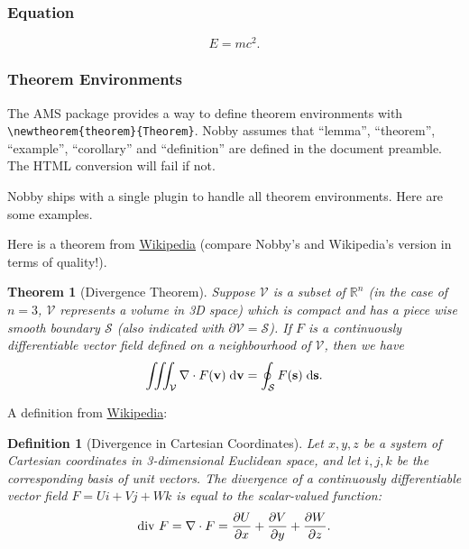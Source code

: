 \documentclass[10pt]{article}
\newtheorem{theorem}{Theorem}
\newtheorem{definition}{Definition}
\newcommand{\mvec}[1]{\mathbf{#1}}
\begin{document}
\subsubsection{Equation}
\begin{equation}
  \label{eq:rel}
  E = mc^2.
\end{equation}

\subsubsection{Theorem Environments}
The AMS package provides a way to define theorem environments with
\texttt{\textbackslash{newtheorem\{theorem\}\{Theorem\}}}. Nobby
assumes that ``lemma'', ``theorem'', ``example'', ``corollary'' and
``definition'' are defined in the document preamble. The HTML conversion
will fail if not.

Nobby ships with a single plugin to handle all theorem
environments. Here are some examples.

Here is a theorem from
\href{http://en.wikipedia.org/wiki/Divergence_theorem}{Wikipedia} 
(compare Nobby's and Wikipedia's version in terms of quality!).
\begin{theorem}[Divergence Theorem]
  \label{thm:div}
  Suppose $\mathcal{V}$ is a subset of $\mathbb{R}^n$ (in the case of
  $n=3$, $\mathcal{V}$ represents a volume in 3D space) which is
  compact and has a piece wise smooth boundary $\mathcal{S}$ (also
  indicated with $\partial\mathcal{V} = \mathcal{S}$). If $F$ is a
  continuously differentiable vector field defined on a neighbourhood
  of $\mathcal{V}$, then we have
  \begin{align}
    \iiint_{\mathcal{V}} \nabla \cdot F(\mvec{v})\; \textnormal{d}\mvec{v}
    = \oint_{\mathcal{S}} F(\mvec{s})\; \textnormal{d}\mvec{s}.
  \end{align}
\end{theorem}

A definition from \href{http://en.wikipedia.org/wiki/Divergence}{Wikipedia}:
\begin{definition}[Divergence in Cartesian Coordinates]
  \label{def:div}
  Let $x, y, z$ be a system of Cartesian coordinates in 3-dimensional
  Euclidean space, and let $i, j, k$ be the corresponding basis of unit
  vectors. The divergence of a continuously differentiable vector
  field $F = U i + V j + W k$ is equal to the scalar-valued function:
  \begin{align}
    \textnormal{div } F = \nabla \cdot F = 
    \frac{\partial U}{\partial x} +
    \frac{\partial V}{\partial y} +
    \frac{\partial W}{\partial z}.
  \end{align}
\end{definition}
\end{document}
